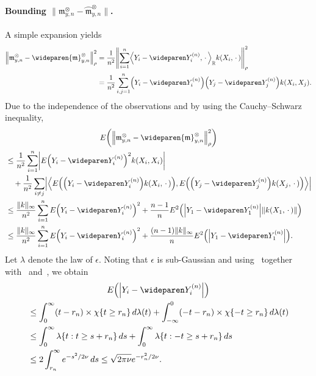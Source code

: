 \documentclass[10pt]{amsart}
\theoremstyle{definition}\newtheorem{defi}[theo]{Definition}\newtheorem{rema}[theo]{Remark}\newtheorem{exam}[theo]{Example}\newtheorem{exem}[theo]{Example}\newtheorem{nota}[theo]{Notation}
\theoremstyle{remark}
\newcommand{\R}{\mathbb{R}}
\newcommand{\mean}{\mathfrak{m}}
\newcommand*{\MK}{\mkern 2mu}
\let\originalleft\left
\let\originalright\right
\renewcommand{\left}{\mathopen{}\mathclose\bgroup\originalleft}
\renewcommand{\right}{\aftergroup\egroup\originalright}
\begin{document}
\paragraph{Bounding $\| \mean_{y,n}^{\otimes} - \wideparen{\mean}_{y,n}^\otimes \|$.} A simple expansion yields
\begin{align*}
\left\| \mean_{y,n}^{\otimes} - \wideparen{\mean}_{y,n}^\otimes \right \|^2_{\rho} &= \frac{1}{n^2} \left\| \sum_{i=1}^n \left\langle Y_i - \wideparen Y^{(n)}_i, \,\cdot\, \right\rangle_\R k(X_i,\,\cdot\,) \right\|_\rho^2\\
&= \frac{1}{n^2} \sum_{i,j =1}^n \left(Y_i - \wideparen Y^{(n)}_i\right) \left(Y_j - \wideparen Y_j^{(n)}\right) k(X_i, X_j).
\end{align*}
Due to the independence of the observations and by using the Cauchy--Schwarz inequality,
\begin{multline*}
E\left(\left\|\mean_{y,n}^{\otimes} - \wideparen{\mean}_{y,n}^\otimes \right\|^2_{\rho}\right)\\
\begin{aligned}
&\leq \frac{1}{n^2} \sum_{i =1}^n \left| E \left(Y_i - \wideparen Y^{(n)}_i\right)^2 k(X_i, X_i)\right| \\
&\quad+ \frac{1}{n^2} \sum_{i \not = j} \left|\left\langle E\left(\left(Y_i - \wideparen Y^{(n)}_i\right) k(X_i,\,\cdot\,)\right), E\left(\left(Y_j - \wideparen Y_j^{(n)}\right) k(X_j,\,\cdot\,)\right) \right\rangle \right| \\
&\leq  \frac{\|k\|_\infty}{n^2} \sum_{i =1}^n E \left(Y_i - \wideparen Y^{(n)}_i\right)^2 + \frac{n-1}{n} E^2\left(\left|Y_1 - \wideparen Y^{(n)}_1\right| \|k(X_1,\,\cdot\,)\|\right) \\
&\leq \frac{\|k\|_\infty}{n^2} \sum_{i =1}^n E \left(Y_i - \wideparen Y^{(n)}_i\right)^2 + \frac{(n-1)\|k\|_\infty}{n} E^2\left(\left|Y_1 - \wideparen Y^{(n)}_1\right|\right).
\end{aligned}
\end{multline*}
Let $\lambda$ denote the law of $\epsilon$. Noting that $\epsilon$ is sub-Gaussian and using~\cite[Section~2.3]{GAB13} together with~\cite[252O]{FREM} and~\cite[Proposition~2.5$\MK$(a)]{DUDLEY14}, we obtain
\begin{multline}\label{eq:cappedYabs}
E\left(\left|Y_i - \wideparen Y^{(n)}_i\right|\right)\\
\begin{aligned}
&\leq \int_0^\infty (t - r_n) \times \chi\{t \geq r_n \} \, d\lambda(t) + \int_{-\infty}^0 (-t - r_n) \times \chi\{ - t \geq r_n\} \, d\lambda(t)  \\
&\leq \int_0^\infty \lambda\{ t : t \geq s + r_n\} \, ds + \int_0^\infty \lambda\{t : -t \geq s + r_n \} \, ds  \\
&\leq 2 \int_{r_n}^\infty e^{-s^2/2 \nu} \, ds
\leq \sqrt{2\pi \nu} e^{-r_n^2/ 2 \nu}.
\end{aligned}
\end{multline}
\end{document}
